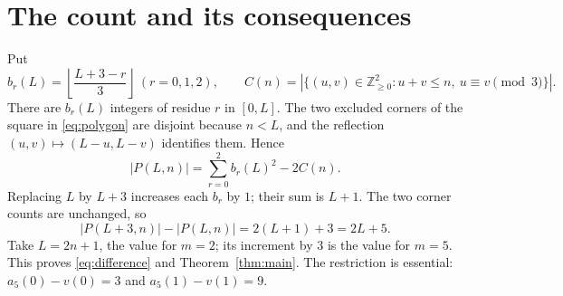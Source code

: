 \documentclass[11pt]{article}
\newcommand{\Z}{\mathbb Z}
\begin{document}
\section{The count and its consequences}
Put
\[
 b_r(L)=\left\lfloor\frac{L+3-r}{3}\right\rfloor\ (r=0,1,2),\qquad
 C(n)=|\{(u,v)\in\Z_{\geq0}^2:u+v\leq n,\ u\equiv v\pmod3\}|.
\]
There are $b_r(L)$ integers of residue $r$ in $[0,L]$. The two excluded
corners of the square in \eqref{eq:polygon} are disjoint because $n<L$,
and the reflection $(u,v)\mapsto(L-u,L-v)$ identifies them. Hence
\begin{equation}\label{eq:count}
 |P(L,n)|=\sum_{r=0}^2 b_r(L)^2-2C(n).
\end{equation}
Replacing $L$ by $L+3$ increases each $b_r$ by $1$; their sum is $L+1$.
The two corner counts are unchanged, so
\[
 |P(L+3,n)|-|P(L,n)|=2(L+1)+3=2L+5.
\]
Take $L=2n+1$, the value for $m=2$; its increment by $3$ is the value
for $m=5$. This proves \eqref{eq:difference} and Theorem~\ref{thm:main}.
The restriction is essential: $a_5(0)-v(0)=3$ and $a_5(1)-v(1)=9$.
\end{document}
